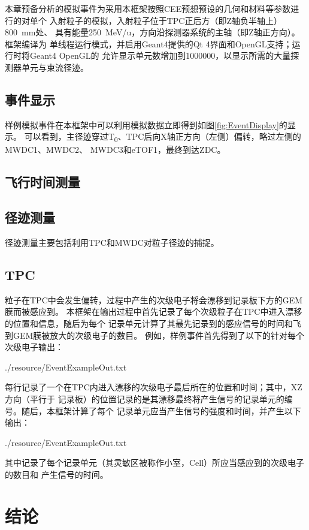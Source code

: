 \documentclass[bachelor,openany,oneside,color]{buaathesis}
\def\TZ{T\textsubscript{0}}
\begin{document}
本章预备分析的模拟事件为采用本框架按照CEE预想预设的几何和材料等参数进行的对单个
入射粒子的模拟，入射粒子位于TPC正后方（即Z轴负半轴上）\SI{800}{\milli\meter}处、
具有能量\SI{250}{\mega\eV/u}，方向沿探测器系统的主轴（即Z轴正方向）。框架编译为
单线程运行模式，并启用Geant4提供的Qt 4界面和OpenGL支持；运行时将Geant4 OpenGL的
允许显示单元数增加到1000000，以显示所需的大量探测器单元与束流径迹。

\section{事件显示}

样例模拟事件在本框架中可以利用模拟数据立即得到如图\ref{fig:EventDisplay}的显示。
可以看到，主径迹穿过\TZ、TPC后向X轴正方向（左侧）偏转，略过左侧的MWDC1、MWDC2、
MWDC3和eTOF1，最终到达ZDC。

\section{飞行时间测量}%

\section{径迹测量}

径迹测量主要包括利用TPC和MWDC对粒子径迹的捕捉。

\section{TPC}

粒子在TPC中会发生偏转，过程中产生的次级电子将会漂移到记录板下方的GEM膜而被感应到。
本框架在输出过程中首先记录了每个次级粒子在TPC中进入漂移的位置和信息，随后为每个
记录单元计算了其最先记录到的感应信号的时间和飞到GEM膜被放大的次级电子的数目。
例如，样例事件首先得到了以下的针对每个次级电子输出：


{./resource/EventExampleOut.txt}

每行记录了一个在TPC内进入漂移的次级电子最后所在的位置和时间；其中，XZ方向（平行于
记录板）的位置记录的是其漂移最终将产生信号的记录单元的编号。随后，本框架计算了每个
记录单元应当产生信号的强度和时间，并产生以下输出：


{./resource/EventExampleOut.txt}

其中记录了每个记录单元（其灵敏区被称作小室，Cell）所应当感应到的次级电子的数目和
产生信号的时间。


\chapter*{结论}



%
\printbibliography[heading=bibintoc,title={参考文献}]

\appendix
%
%
\end{document}
